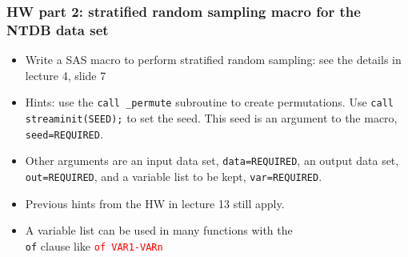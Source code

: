 \documentclass[11pt,pdftex,dvipsnames,usenames,helvetica]{beamer}
\begin{document}
\begin{frame}[fragile]
\frametitle{HW part 2: stratified random sampling macro for the NTDB
data set}
\begin{itemize}
\item Write a SAS macro to perform stratified random sampling:
see the details in lecture 4, slide 7
\item Hints: use the {\tt call
    \_permute} subroutine to create permutations. Use {\tt call
    streaminit(SEED);} to set the seed.  This seed is an argument to
  the macro, {\tt seed=REQUIRED}.
\item Other arguments are an input data set, {\tt data=REQUIRED},
an output data set, {\tt out=REQUIRED}, and a variable
list to be kept, {\tt var=REQUIRED}.
\item Previous hints from the HW in lecture 13 still apply.
\item A variable list can be used in many functions with the\\ 
{\tt of} clause like \textcolor{red}{\tt of VAR1-VARn}\\
\end{itemize}
\end{frame}
\end{document}
